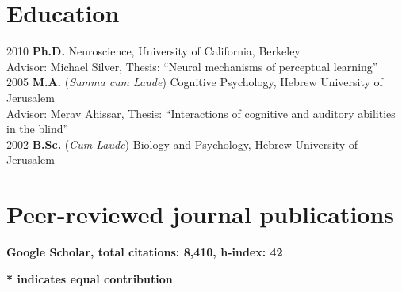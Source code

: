 \documentclass[11pt,fullpage]{article}
\begin{document}
\section*{Education}

	2010  {\bf Ph.D. } Neuroscience, University of California, Berkeley \\
  \hspace{\parindent} Advisor: Michael Silver, Thesis: ``Neural mechanisms of perceptual learning''\\
	2005  {\bf M.A.} (\emph{Summa cum Laude}) Cognitive Psychology, Hebrew University of Jerusalem \\
  \hspace{\parindent} Advisor: Merav Ahissar, Thesis: ``Interactions of cognitive and auditory abilities in the blind'' \\
	2002  {\bf B.Sc.} (\emph{Cum Laude}) Biology and Psychology, Hebrew University of Jerusalem \\

\section*{Peer-reviewed journal publications}

\textbf{Google Scholar, total citations: 8,410, h-index: 42}

\textbf{* indicates equal contribution}
\end{document}
